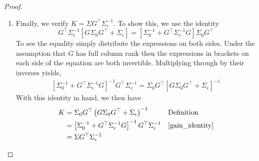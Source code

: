 \documentclass[12pt]{article}
\begin{document}
\begin{proof}
\begin{enumerate}
\item Finally, we verify $K = \Sigma G^\top \Sigma_{\epsilon}^{-1}$. To show this, we use the identity 
\[G^\top \Sigma^{-1}_{\epsilon} \left[G \Sigma_0 G^\top + \Sigma_\epsilon \right] = \left[\Sigma_0^{-1} + G^\top \Sigma^{-1}_{\epsilon}G \right] \Sigma_0 G^\top \]
To see the equality simply distribute the expressions on both sides. Under the assumption that $G$ has full column rank then the expressions in brackets on each side 
of the equation are both invertible. Multiplying through by their inverses yields, 
\begin{align}
\left[\Sigma_0^{-1} + G^\top \Sigma_{\epsilon}^{-1} G \right]^{-1} G^\top \Sigma_{\epsilon}^{-1} = \Sigma_0 G^\top \left[G \Sigma_0 G^\top + \Sigma_{\epsilon} \right]^{-1} \label{gain_identity}
\end{align}
With this identity in hand, we then have 
\begin{align*}
K &= \Sigma_0 G^\top \left(G\Sigma_0 G^\top + \Sigma_\epsilon \right)^{-1} && \text{Definition} \\
   &= \left[\Sigma_0^{-1} + G^\top \Sigma_{\epsilon}^{-1} G \right]^{-1} G^\top \Sigma_{\epsilon}^{-1} &&\ref{gain_identity} \\
   &= \Sigma G^\top \Sigma_{\epsilon}^{-1}
\end{align*}

\end{enumerate}
\end{proof}
\end{document}

